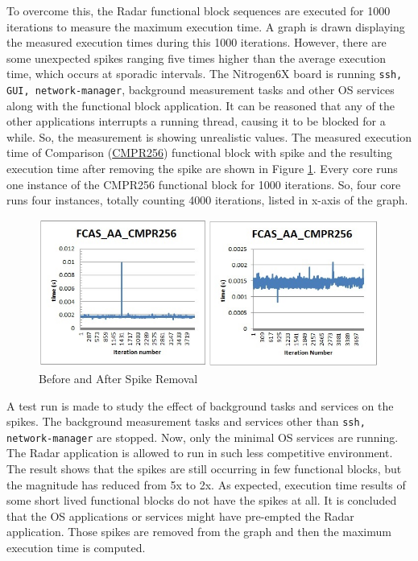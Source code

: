 To overcome this, the Radar functional block sequences are executed for 1000 iterations to measure the maximum execution time. A graph is drawn displaying the measured execution times during this 1000 iterations. However, there are some unexpected spikes ranging five times higher than the average execution time, which occurs at sporadic intervals. The Nitrogen6X board is running \texttt{ssh, GUI, network-manager}, background measurement tasks and other OS services along with the functional block application. It can be reasoned that any of the other applications interrupts a running thread, causing it to be blocked for a while. So, the measurement is showing unrealistic values. The measured execution time of Comparison (\hyperlink{benchmarks}{CMPR256}) functional block with spike and the resulting execution time after removing the spike are shown in Figure \ref{fig:mm:chop_off}. Every core runs one instance of the CMPR256 functional block for 1000 iterations. So, four core runs four instances, totally counting 4000 iterations, listed in x-axis of the graph.

\begin{figure}[h!]
	\centering
	\includegraphics[width=150mm]{figures/chop_off}
	\caption{Before and After Spike Removal}
	\label{fig:mm:chop_off}
\end{figure}
A test run is made to study the effect of background tasks and services on the spikes. The background measurement tasks and services other than \verb|ssh, network-manager| are stopped. Now, only the minimal OS services are running. The Radar application is allowed to run in such less competitive environment. The result shows that the spikes are still occurring in few functional blocks, but the magnitude has reduced from 5x to 2x. As expected, execution time results of some short lived functional blocks do not have the spikes at all. It is concluded that the OS applications or services might have pre-empted the Radar application. Those spikes are removed from the graph and then the maximum execution time is computed. \vspace*{0.2cm}

